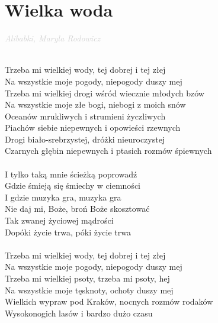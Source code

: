 \documentclass[a5paper, 10pt]{book}
\begin{document}
\newpage
\section{Wielka woda}\textcolor{lightgray}{\textit{Alibabki, Maryla Rodowicz}}\\~\\
\begin{minipage}[t]{0.8\textwidth}
Trzeba mi wielkiej wody, tej dobrej i tej złej\\
Na wszystkie moje pogody, niepogody duszy mej\\
Trzeba mi wielkiej drogi wśród wiecznie młodych bzów\\
Na wszystkie moje złe bogi, niebogi z moich snów\\
\hspace*{3mm}Oceanów mrukliwych i strumieni życzliwych\\
\hspace*{3mm}Piachów siebie niepewnych i opowieści rzewnych\\
\hspace*{3mm}Drogi biało-srebrzystej, dróżki nieuroczystej\\
\hspace*{3mm}Czarnych głębin niepewnych i ptasich rozmów śpiewnych\\
\\
\hspace*{6mm}I tylko taką mnie ścieżką poprowadź\\
\hspace*{6mm}Gdzie śmieją się śmiechy w ciemności\\
\hspace*{6mm}I gdzie muzyka gra, muzyka gra\\
\hspace*{6mm}Nie daj mi, Boże, broń Boże skosztować\\
\hspace*{6mm}Tak zwanej życiowej mądrości\\
\hspace*{6mm}Dopóki życie trwa, póki życie trwa\\
\\
Trzeba mi wielkiej wody, tej dobrej i tej złej\\
Na wszystkie moje pogody, niepogody duszy mej\\
Trzeba mi wielkiej psoty, trzeba mi psoty, hej\\
Na wszystkie moje tęsknoty, ochoty duszy mej\\
\hspace*{3mm}Wielkich wypraw pod Kraków, nocnych rozmów rodaków\\
\hspace*{3mm}Wysokonogich lasów i bardzo dużo czasu\\

\end{minipage}
\end{document}
